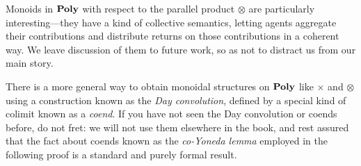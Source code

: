 \documentclass[Book-Poly]{subfiles}
\begin{document}
\begin{remark}
  Monoids in $\mathbf{Poly}$ with respect to the parallel product $\otimes$ are particularly interesting---they have a kind of collective semantics, letting agents aggregate their contributions and distribute returns on those contributions in a coherent way.
  We leave discussion of them to future work, so as not to distract us from our main story.

\end{remark}


There is a more general way to obtain monoidal structures on $\mathbf{Poly}$ like $\times$ and $\otimes$ using a construction known as the \emph{Day convolution}, defined by a special kind of colimit known as a \emph{coend}. If you have not seen the Day convolution or coends before, do not fret: we will not use them elsewhere in the book, and rest assured that the fact about coends known as the \emph{co-Yoneda lemma} employed in the following proof is a standard and purely formal result.

\end{document}
